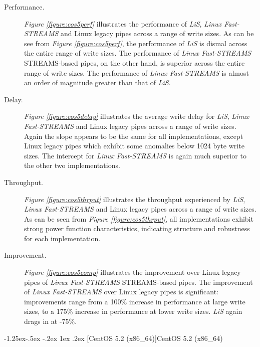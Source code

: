 \documentclass[letterpaper,final,notitlepage,twocolumn,10pt,twoside]{article}
\makeatletter
\let\normalsize = \small
\let\small = \footnotesize
\let\footnotesize = \scriptsize
\let\scriptsize = \tiny
\renewcommand\subsubsection{\@startsection{subsubsection}{3}{\z@}%
                                     {-1.25ex\@plus -.5ex \@minus -.2ex}%
                                     {1ex \@plus .2ex}%
                                     {\normalfont\normalsize\bfseries}}
\makeatother
\begin{document}
\begin{description}

\item[Performance.]

\textit{Figure \ref{figure:cos5perf}}
illustrates the performance of \textsl{LiS}, \textsl{Linux Fast-STREAMS} and Linux legacy pipes
across a range of write sizes.  As can be see from \textit{Figure \ref{figure:cos5perf}}, the
performance of \textsl{LiS} is dismal across the entire range of write sizes.  The performance of
\textsl{Linux Fast-STREAMS} STREAMS-based pipes, on the other hand, is superior across the entire
range of write sizes.  The performance of \textsl{Linux Fast-STREAMS} is almost an order of
magnitude greater than that of \textsl{LiS}.

\item[Delay.]

\textit{Figure \ref{figure:cos5delay}}
illustrates the average write delay for \textsl{LiS}, \textsl{Linux Fast-STREAMS} and Linux legacy
pipes across a range of write sizes.  Again the slope appears to be the same for all
implementations, except Linux legacy pipes which exhibit some anomalies below 1024 byte write sizes.
The intercept for \textsl{Linux Fast-STREAMS} is again much superior to the other two
implementations.

\item[Throughput.]

\textit{Figure \ref{figure:cos5thrput}}
illustrates the throughput experienced by \textsl{LiS}, \textsl{Linux Fast-STREAMS} and Linux legacy
pipes across a range of write sizes.  As can be seen from \textit{Figure \ref{figure:cos5thrput}},
all implementations exhibit strong power function characteristics, indicating structure and
robustness for each implementation.

\item[Improvement.]

\textit{Figure \ref{figure:cos5comp}}
illustrates the improvement over Linux legacy pipes of \textsl{Linux Fast-STREAMS} STREAMS-based
pipes.  The improvement of \textsl{Linux Fast-STREAMS} over Linux legacy pipes is significant:
improvements range from a 100\% increase in performance at large write sizes, to a 175\% increase in
performance at lower write sizes.  \textsl{LiS} again drags in at -75\%.

\end{description}

\subsubsection[CentOS 5.2 (x86\_64)]{CentOS 5.2 (x86\_64)}
\end{document}
